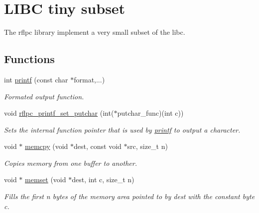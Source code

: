 \hypertarget{group__libc}{\section{L\-I\-B\-C tiny subset}
\label{group__libc}
}


The rflpc library implement a very small subset of the libc.  


\subsection*{Functions}
\begin{DoxyCompactItemize}
\item 
int \hyperlink{group__libc_ga98631211a4a8aee62f572375d5b637be}{printf} (const char $\ast$format,...)
\begin{DoxyCompactList}\small\item\em Formated output function. \end{DoxyCompactList}\item 
void \hyperlink{group__libc_gadce147a756b0ce3fa99e928e32c44db4}{rflpc\-\_\-printf\-\_\-set\-\_\-putchar} (int($\ast$putchar\-\_\-func)(int c))
\begin{DoxyCompactList}\small\item\em Sets the internal function pointer that is used by \hyperlink{group__libc_ga98631211a4a8aee62f572375d5b637be}{printf} to output a character. \end{DoxyCompactList}\end{DoxyCompactItemize}
\begin{DoxyCompactItemize}
\item 
void $\ast$ \hyperlink{group__libc_ga14938524dcbeb59d7117ba5e151ad1b1}{memcpy} (void $\ast$dest, const void $\ast$src, size\-\_\-t n)
\begin{DoxyCompactList}\small\item\em Copies memory from one buffer to another. \end{DoxyCompactList}\end{DoxyCompactItemize}
\begin{DoxyCompactItemize}
\item 
void $\ast$ \hyperlink{group__libc_ga362b656d9de3289b55b1035d14cb4b5d}{memset} (void $\ast$dest, int c, size\-\_\-t n)
\begin{DoxyCompactList}\small\item\em Fills the first n bytes of the memory area pointed to by dest with the constant byte c. \end{DoxyCompactList}\end{DoxyCompactItemize}


